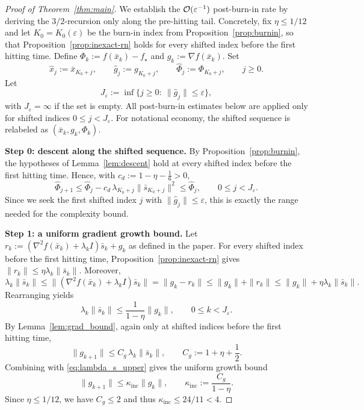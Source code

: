 \documentclass[review,onefignum,onetabnum]{siamart171218}
\begin{document}
	\begin{proof}[Proof of Theorem~\ref{thm:main}]
		We establish the $\mathcal{O}(\varepsilon^{-1})$ post-burn-in rate
		by deriving the $3/2$-recursion only along the pre-hitting tail.
		Concretely, fix $\eta\le 1/12$ and let $K_0=K_0(\varepsilon)$ be
		the burn-in index from Proposition~\ref{prop:burnin}, so that
		Proposition~\ref{prop:inexact-rn} holds for every shifted index
		before the first hitting time.
		Define $\Phi_k:=f(\bar x_k)-f_\star$ and $g_k:=\nabla f(\bar x_k)$.
		Set
		\[
		\hat x_j:=\bar x_{K_0+j},\qquad
		\hat g_j:=g_{K_0+j},\qquad
		\hat\Phi_j:=\Phi_{K_0+j},\qquad j\ge0.
		\]
		Let
		\[
		J_\varepsilon:=\inf\{j\ge0:\ \|\hat g_j\|\le\varepsilon\},
		\]
		with $J_\varepsilon=\infty$ if the set is empty.  All
		post-burn-in estimates below are applied only for shifted indices
		$0\le j<J_\varepsilon$.  For notational economy, the shifted
		sequence is relabeled as $(\bar x_k,g_k,\Phi_k)$.
		
		\smallskip
		\noindent\textbf{Step 0: descent along the shifted sequence.}
		By Proposition~\ref{prop:burnin}, the hypotheses of
		Lemma~\ref{lem:descent} hold at every shifted index before the
		first hitting time.
		Hence, with $c_d:=1-\eta-\frac16>0$,
		\begin{equation}\label{eq:Phi_monotone}
			\hat\Phi_{j+1}\le \hat\Phi_j
			- c_d\,\lambda_{K_0+j}\|\bar s_{K_0+j}\|^2
			\le \hat\Phi_j,
			\qquad 0\le j<J_\varepsilon.
		\end{equation}
		Since we seek the first shifted index $j$ with
		$\|\hat g_j\|\le\varepsilon$, this is exactly the range needed for
		the complexity bound.
		
		\smallskip
		\noindent\textbf{Step 1: a uniform gradient growth bound.}
		Let $r_k:=(\nabla^2 f(\bar x_k)+\lambda_k I)\bar s_k+g_k$ as defined in the paper.
		For every shifted index before the first hitting time,
		Proposition~\ref{prop:inexact-rn} gives
		$\|r_k\|\le \eta\lambda_k\|\bar s_k\|$.
		Moreover,
		\[
		\lambda_k\|\bar s_k\|
		\le \|(\nabla^2 f(\bar x_k)+\lambda_k I)\bar s_k\|
		=\|g_k-r_k\|
		\le \|g_k\|+\|r_k\|
		\le \|g_k\|+\eta\lambda_k\|\bar s_k\|.
		\]
		Rearranging yields
		\begin{equation}\label{eq:lambda_s_upper}
			\lambda_k\|\bar s_k\|\le \frac{1}{1-\eta}\|g_k\|,\qquad 0\le k<J_\varepsilon.
		\end{equation}
		By Lemma~\ref{lem:grad_bound}, again only at shifted indices
		before the first hitting time,
		\[
		\|g_{k+1}\|\le C_g\,\lambda_k\|\bar s_k\|,
		\qquad
		C_g:=1+\eta+\frac12.
		\]
		Combining with \eqref{eq:lambda_s_upper} gives the uniform growth bound
		\begin{equation}\label{eq:grad_growth}
			\|g_{k+1}\|\le \kappa_{\mathrm{inc}}\|g_k\|,
			\qquad
			\kappa_{\mathrm{inc}}:=\frac{C_g}{1-\eta}.
		\end{equation}
		Since $\eta\le 1/12$, we have $C_g\le 2$ and thus $\kappa_{\mathrm{inc}}\le 24/11<4$.
		

\end{proof}
\end{document}
